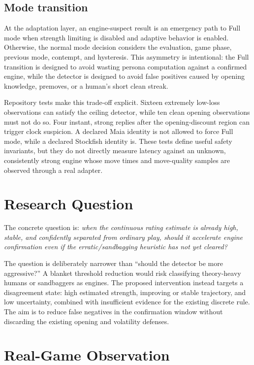 \documentclass[conference]{IEEEtran}
\begin{document}
\subsection{Mode transition}
At the adaptation layer, an engine-suspect result is an emergency path to Full mode when strength limiting is disabled and adaptive behavior is enabled. Otherwise, the normal mode decision considers the evaluation, game phase, previous mode, contempt, and hysteresis. This asymmetry is intentional: the Full transition is designed to avoid wasting persona computation against a confirmed engine, while the detector is designed to avoid false positives caused by opening knowledge, premoves, or a human's short clean streak.

Repository tests make this trade-off explicit. Sixteen extremely low-loss observations can satisfy the ceiling detector, while ten clean opening observations must not do so. Four instant, strong replies after the opening-discount region can trigger clock suspicion. A declared Maia identity is not allowed to force Full mode, while a declared Stockfish identity is. These tests define useful safety invariants, but they do not directly measure latency against an unknown, consistently strong engine whose move times and move-quality samples are observed through a real adapter.

\section{Research Question}
The concrete question is: \emph{when the continuous rating estimate is already high, stable, and confidently separated from ordinary play, should it accelerate engine confirmation even if the erratic/sandbagging heuristic has not yet cleared?}

The question is deliberately narrower than ``should the detector be more aggressive?'' A blanket threshold reduction would risk classifying theory-heavy humans or sandbaggers as engines. The proposed intervention instead targets a disagreement state: high estimated strength, improving or stable trajectory, and low uncertainty, combined with insufficient evidence for the existing discrete rule. The aim is to reduce false negatives in the confirmation window without discarding the existing opening and volatility defenses.

\section{Real-Game Observation}
\end{document}
